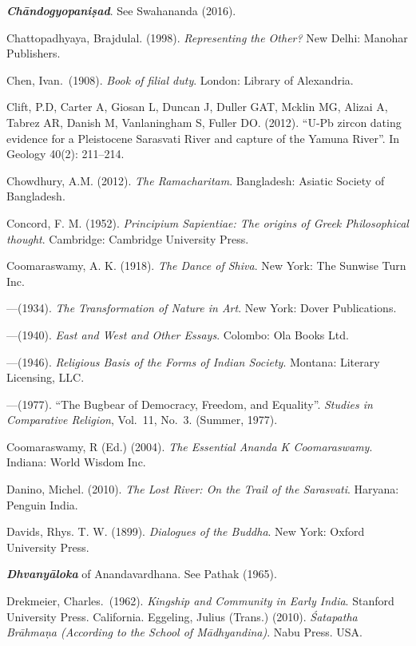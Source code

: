 \begin{thebibliography}{99}
{\sl\bfseries Chāndogyopaniṣad}. See Swahananda (2016).

Chattopadhyaya, Brajdulal. (1998). {\sl Representing the Other?} New Delhi: Manohar Publishers. 

Chen, Ivan.\ (1908). {\sl Book of filial duty}. London: Library of Alexandria. 

Clift, P.D, Carter A, Giosan L, Duncan J, Duller GAT, Mcklin MG, Alizai A, Tabrez AR, Danish M, Vanlaningham S, Fuller DO. (2012). “U-Pb zircon dating evidence for a Pleistocene Sarasvati River and capture of the Yamuna River”. In Geology 40(2): 211--214.

Chowdhury, A.M. (2012). {\sl The Ramacharitam}. Bangladesh: Asiatic Society of Bangladesh. 

Concord, F. M. (1952). {\sl Principium Sapientiae: The origins of Greek Philosophical thought}. Cambridge: Cambridge University Press. 

Coomaraswamy, A. K. (1918). {\sl The Dance of Shiva}. New York: The Sunwise Turn Inc. 

---\kern3pt(1934). {\sl The Transformation of Nature in Art}. New York: Dover Publications.

---\kern3pt(1940). {\sl East and West and Other Essays}. Colombo: Ola Books Ltd. 

---\kern3pt(1946). {\sl Religious Basis of the Forms of Indian Society}. Montana: Literary Licensing, LLC.

---\kern3pt(1977). “The Bugbear of Democracy, Freedom, and Equality”. {\sl Studies in Comparative Religion}, Vol.~11, No.~3. (Summer, 1977). 

Coomaraswamy, R (Ed.) (2004). {\sl The Essential Ananda K Coomaraswamy}. Indiana: World Wisdom Inc.

Danino, Michel. (2010). {\sl The Lost River: On the Trail of the Sarasvati}. Haryana: Penguin India.  

Davids, Rhys. T. W. (1899). {\sl Dialogues of the Buddha}. New York: Oxford University Press. 

{\sl\bfseries Dhvanyāloka} of Anandavardhana. See Pathak (1965).

Drekmeier, Charles.\ (1962). {\sl Kingship and Community in Early India}. Stanford University Press. California. Eggeling, Julius (Trans.) (2010). {\sl Śatapatha Brāhmaṇa (According to the School of Mādhyandina)}. Nabu Press. USA. 


\end{thebibliography}
